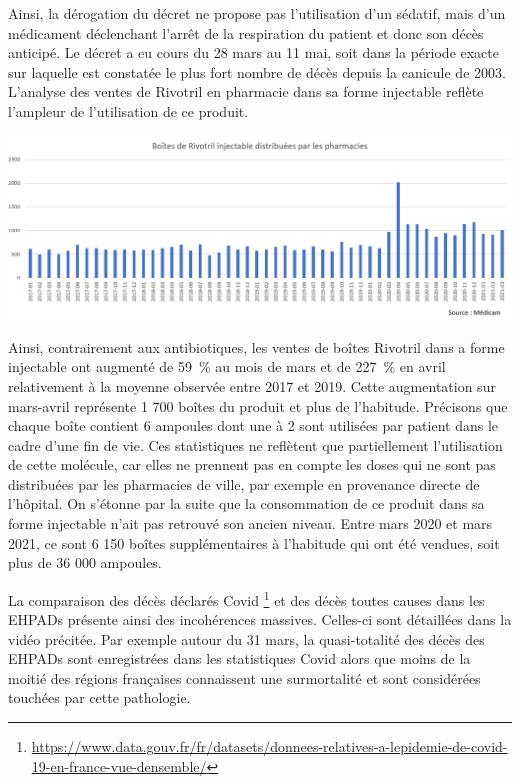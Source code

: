 \documentclass[
]{article}
\begin{document}
Ainsi, la dérogation du décret ne propose pas l'utilisation d'un
sédatif, mais d'un médicament déclenchant l'arrêt de la respiration du
patient et donc son décès anticipé. Le décret a eu cours du 28 mars au
11 mai, soit dans la période exacte sur laquelle est constatée le plus
fort nombre de décès depuis la canicule de 2003. L'analyse des ventes de
Rivotril en pharmacie dans sa forme injectable reflète l'ampleur de
l'utilisation de ce produit.

\includegraphics[width=10.41667in,height=\textheight]{data/images/rivotril.png}

Ainsi, contrairement aux antibiotiques, les ventes de boîtes Rivotril
dans a forme injectable ont augmenté de 59~\% au mois de mars et de
227~\% en avril relativement à la moyenne observée entre 2017 et 2019.
Cette augmentation sur mars-avril représente 1 700 boîtes du produit et
plus de l'habitude. Précisons que chaque boîte contient 6 ampoules dont
une à 2 sont utilisées par patient dans le cadre d'une fin de vie. Ces
statistiques ne reflètent que partiellement l'utilisation de cette
molécule, car elles ne prennent pas en compte les doses qui ne sont pas
distribuées par les pharmacies de ville, par exemple en provenance
directe de l'hôpital. On s'étonne par la suite que la consommation de ce
produit dans sa forme injectable n'ait pas retrouvé son ancien niveau.
Entre mars 2020 et mars 2021, ce sont 6 150 boîtes supplémentaires à
l'habitude qui ont été vendues, soit plus de 36 000 ampoules.

La comparaison des décès déclarés Covid \footnote{\url{https://www.data.gouv.fr/fr/datasets/donnees-relatives-a-lepidemie-de-covid-19-en-france-vue-densemble/}}
et des décès toutes causes dans les EHPADs présente ainsi des
incohérences massives. Celles-ci sont détaillées dans la vidéo précitée.
Par exemple autour du 31 mars, la quasi-totalité des décès des EHPADs
sont enregistrées dans les statistiques Covid alors que moins de la
moitié des régions françaises connaissent une surmortalité et sont
considérées touchées par cette pathologie.
\end{document}
